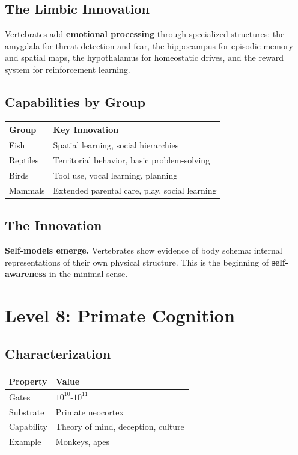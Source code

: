 \documentclass[
  11pt,
  letterpaper,
  twoside,
  openright]{book}
\begin{document}
\subsection{The Limbic Innovation}\label{the-limbic-innovation}

Vertebrates add \textbf{emotional processing} through specialized
structures: the amygdala for threat detection and fear, the hippocampus
for episodic memory and spatial maps, the hypothalamus for homeostatic
drives, and the reward system for reinforcement learning.

\subsection{Capabilities by Group}\label{capabilities-by-group}

\begin{longtable}[]{@{}ll@{}}
\toprule\noalign{}
Group & Key Innovation \\
\midrule\noalign{}
\endhead
\bottomrule\noalign{}
\endlastfoot
Fish & Spatial learning, social hierarchies \\
Reptiles & Territorial behavior, basic problem-solving \\
Birds & Tool use, vocal learning, planning \\
Mammals & Extended parental care, play, social learning \\
\end{longtable}

\subsection{The Innovation}\label{the-innovation-5}

\textbf{Self-models emerge.} Vertebrates show evidence of body schema:
internal representations of their own physical structure. This is the
beginning of \textbf{self-awareness} in the minimal sense.

\section{Level 8: Primate Cognition}\label{level-8-primate-cognition}

\subsection{Characterization}\label{characterization-8}

\begin{longtable}[]{@{}ll@{}}
\toprule\noalign{}
Property & Value \\
\midrule\noalign{}
\endhead
\bottomrule\noalign{}
\endlastfoot
Gates & \(10^{10}\)-\(10^{11}\) \\
Substrate & Primate neocortex \\
Capability & Theory of mind, deception, culture \\
Example & Monkeys, apes \\
\end{longtable}
\end{document}
